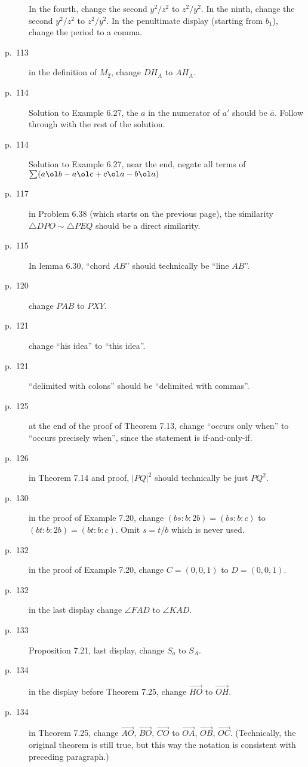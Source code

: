 \documentclass[11pt]{scrartcl}
\begin{document}
\begin{description}
  In the fourth, change the second $y^2/z^2$ to $z^2/y^2$.
  In the ninth, change the second $y^2/z^2$ to $z^2/y^2$.
  In the penultimate display (starting from $b_1$), change the period to a comma.
\item[p.\  113] in the definition of $M_2$, change $DH_A$ to $AH_A$.
\item[p.\  114] Solution to Example 6.27, the $a$ in the numerator of $a'$ should be $\bar a$.
  Follow through with the rest of the solution.
\item[p.\  114] Solution to Example 6.27, near the end, negate all terms of
  $\sum (a \ol b - a \ol c + c \ol a - b \ol a)$
\item[p.\  117] in Problem 6.38 (which starts on the previous page), the similarity
  $\triangle DPO \sim \triangle PEQ$ should be a direct similarity.
\item[p.\ 115] In lemma 6.30, ``chord $AB$'' should technically be ``line $AB$''.
\item[p.\  120] change $PAB$ to $PXY$.
\item[p.\  121] change ``his idea'' to ``this idea''.
\item[p.\  121] ``delimited with colons'' should be
  ``delimited with commas''.
\item[p.\  125] at the end of the proof of Theorem 7.13,
  change ``occurs only when'' to ``occurs precisely when'',
  since the statement is if-and-only-if.
\item[p.\  126] in Theorem 7.14 and proof, $|PQ|^2$ should technically be just $PQ^2$.
\item[p.\  130] in the proof of Example 7.20, change $(bs:b:2b)=(bs:b:c)$ to $(bt:b:2b)=(bt:b:c)$.
  Omit $s=t/b$ which is never used.
\item[p.\  132] in the proof of Example 7.20, change $C = (0, 0, 1)$ to $D = (0, 0, 1)$.
\item[p.\  132] in the last display change $\angle FAD$ to $\angle KAD$.
\item[p.\  133] Proposition 7.21, last display, change $S_a$ to $S_A$.
\item[p.\  134] in the display before Theorem 7.25, change $\overrightarrow{HO}$ to $\overrightarrow{OH}$.
\item[p.\  134] in Theorem 7.25, change
  $\overrightarrow{AO}$, $\overrightarrow{BO}$, $\overrightarrow{CO}$ to
  $\overrightarrow{OA}$, $\overrightarrow{OB}$, $\overrightarrow{OC}$.
  (Technically, the original theorem is still true,
  but this way the notation is consistent with preceding paragraph.)

\end{description}
\end{document}
